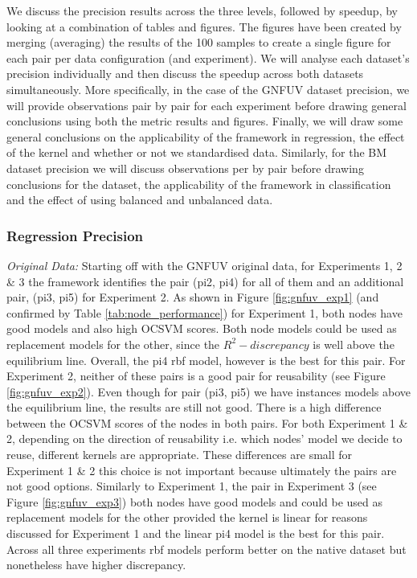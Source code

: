 \documentclass{mpaper}
\begin{document}
We discuss the precision results across the three levels, followed by speedup, by looking at a combination of tables and figures. The figures have been created by merging (averaging) the results of the 100 samples to create a single figure for each pair per data configuration (and experiment). We will analyse each dataset's precision individually and then discuss the speedup across both datasets simultaneously. More specifically, in the case of the GNFUV dataset precision, we will provide observations pair by pair for each experiment before drawing general conclusions using both the metric results and figures. Finally, we will draw some general conclusions on the applicability of the framework in regression, the effect of the kernel and whether or not we standardised data. Similarly, for the BM dataset precision we will discuss observations per by pair before drawing conclusions for the dataset, the applicability of the framework in classification and the effect of using balanced and unbalanced data.

\subsubsection{Regression Precision}

\textit{Original Data:} {} Starting off with the GNFUV original data, for Experiments 1, 2 \& 3 the framework identifies the pair (pi2, pi4) for all of them and an additional pair, (pi3, pi5) for Experiment 2. As shown in Figure \ref{fig:gnfuv_exp1} (and confirmed by Table \ref{tab:node_performance}) for Experiment 1, both nodes have good models and also high OCSVM scores. Both node models could be used as replacement models for the other, since the $R^2 - discrepancy$ is well above the equilibrium line. Overall, the pi4 rbf model, however is the best for this pair. For Experiment 2, neither of these pairs is a good pair for reusability (see Figure \ref{fig:gnfuv_exp2}). Even though for pair (pi3, pi5) we have instances models above the equilibrium line, the results are still not good.  There is a high difference between the OCSVM scores of the nodes in both pairs. For both Experiment 1 \& 2, depending on the direction of reusability i.e. which nodes' model we decide to reuse, different kernels are appropriate. These differences are small for Experiment 1 \& 2 this choice is not important because ultimately the pairs are not good options. Similarly to Experiment 1, the pair in Experiment 3 (see Figure \ref{fig:gnfuv_exp3}) both nodes have good models and could be used as replacement models for the other provided the kernel is linear for reasons discussed for Experiment 1 and the linear pi4 model is the best for this pair. Across all three experiments rbf models perform better on the native dataset but nonetheless have higher discrepancy.
\end{document}
